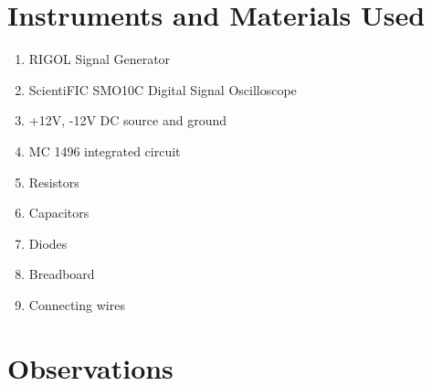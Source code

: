 \documentclass{article}
\begin{document}
\section{Instruments and Materials Used}
\begin{enumerate}
  \item RIGOL Signal Generator
  \item ScientiFIC SMO10C Digital Signal Oscilloscope
  \item +12V, -12V DC source and ground
  \item MC 1496 integrated circuit
  \item Resistors
  \item Capacitors
  \item Diodes
  \item Breadboard
  \item Connecting wires
\end{enumerate}

\section{Observations}
\end{document}
